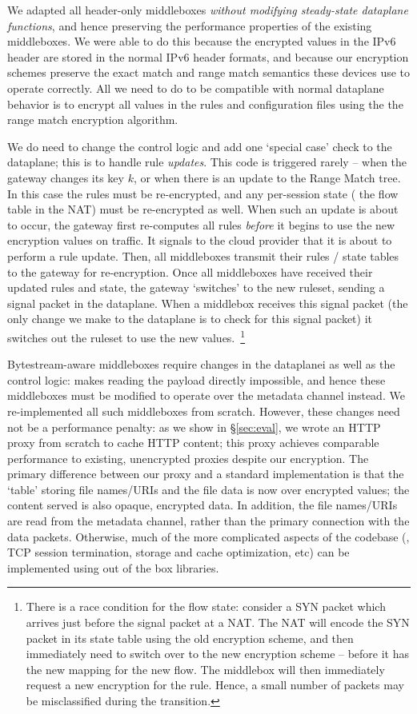 We adapted all header-only middleboxes {\it without modifying steady-state dataplane functions}, and hence preserving the performance properties of the existing middleboxes.
We were able to do this because the encrypted values in the IPv6 header are stored in the normal IPv6 header formats, and because our encryption schemes preserve the exact match and range match semantics these devices use to operate correctly.
All we need to do to be compatible with normal dataplane behavior is to encrypt all values in the rules and configuration files using the the range match encryption algorithm.

We do need to change the control logic and add one `special case' check to the dataplane; this is to handle rule {\it updates}. 
This code is triggered rarely -- when the gateway changes its key $k$, or when there is an update to the Range Match tree.
In this case the rules must be re-encrypted, and any per-session state (\eg{} the flow table in the NAT) must be re-encrypted as well.
When such an update is about to occur, the gateway first re-computes all rules {\it before} it begins to use the new encryption values on traffic. It signals to the cloud provider that it is about to perform a rule update. Then, all middleboxes transmit their rules / state tables to the gateway for re-encryption. 
Once all middleboxes have received their updated rules and state, the gateway `switches' to the new ruleset, sending a signal packet in the dataplane. When a middlebox receives this signal packet (the only change we make to the dataplane is to check for this signal packet) it switches out the ruleset to use the new values.~\footnote{\small There is a race condition for the flow state: consider a SYN packet which arrives just before the signal packet at a NAT. The NAT will encode the SYN packet in its state table using the old encryption scheme, and then immediately need to switch over to the new encryption scheme -- before it has the new mapping for the new flow. The middlebox will then immediately request a new encryption for the rule. Hence, a small number of packets may be misclassified during the transition.}

Bytestream-aware middleboxes require changes in the dataplanei as well as the control logic: \sys makes reading the payload directly impossible, and hence these middleboxes must be modified to operate over the metadata channel instead.
We re-implemented all such middleboxes from scratch.
However, these changes need not be a performance penalty: as we show in \S\ref{sec:eval}, we wrote an HTTP proxy from scratch to cache HTTP content; this proxy achieves comparable performance to existing, unencrypted proxies despite our encryption.
The primary difference between our proxy and a standard implementation is that the `table' storing file names/URIs and the file data is now over encrypted values; the content served is also opaque, encrypted data. 
In addition, the file names/URIs are read from the metadata channel, rather than the primary connection with the data packets. 
Otherwise, much of the more complicated aspects of the codebase (\eg{}, TCP session termination, storage and cache optimization, etc) can be implemented using out of the box libraries.



